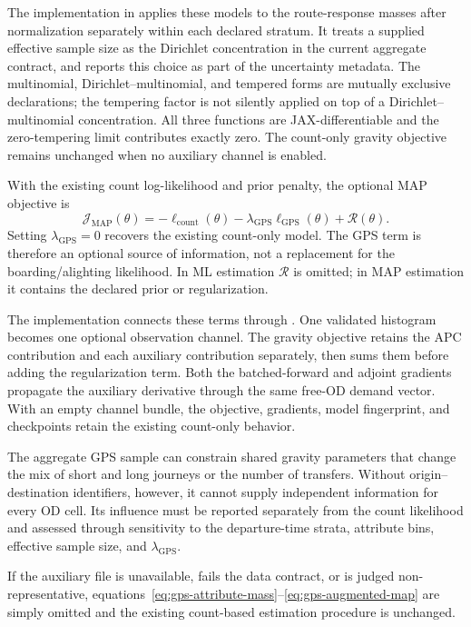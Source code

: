 The implementation in
 applies these
models to the route-response masses after normalization separately within
each declared stratum.  It treats a supplied effective sample size as the
Dirichlet concentration in the current aggregate contract, and reports this
choice as part of the uncertainty metadata.  The multinomial,
Dirichlet--multinomial, and tempered forms are mutually exclusive
declarations; the tempering factor is not silently applied on top of a
Dirichlet--multinomial concentration.  All three functions are
JAX-differentiable and the zero-tempering limit contributes exactly zero.  The
count-only gravity objective remains unchanged when no auxiliary channel is
enabled.

With the existing count log-likelihood and prior penalty, the optional MAP
objective is
\begin{equation}
  \mathcal{J}_{\mathrm{MAP}}(\theta)
  =-\ell_{\mathrm{count}}(\theta)
   -\lambda_{\mathrm{GPS}}\ell_{\mathrm{GPS}}(\theta)
   +\mathcal{R}(\theta).
  \label{eq:gps-augmented-map}
\end{equation}
Setting $\lambda_{\mathrm{GPS}}=0$ recovers the existing count-only model.
The GPS term is therefore an optional source of information, not a replacement
for the boarding/alighting likelihood.  In ML estimation $\mathcal{R}$ is
omitted; in MAP estimation it contains the declared prior or regularization.

The implementation connects these terms through
.  One
validated histogram becomes one optional observation channel.  The gravity
objective retains the APC contribution and each auxiliary contribution
separately, then sums them before adding the regularization term.  Both the
batched-forward and adjoint gradients propagate the auxiliary derivative
through the same free-OD demand vector.  With an empty channel bundle, the
objective, gradients, model fingerprint, and checkpoints retain the existing
count-only behavior.

The aggregate GPS sample can constrain shared gravity parameters that change
the mix of short and long journeys or the number of transfers.  Without
origin--destination identifiers, however, it cannot supply independent
information for every OD cell.  Its influence must be reported separately from
the count likelihood and assessed through sensitivity to the departure-time
strata, attribute bins, effective sample size, and
$\lambda_{\mathrm{GPS}}$.

If the auxiliary file is unavailable, fails the data contract, or is judged
non-representative, equations~\eqref{eq:gps-attribute-mass}--\eqref{eq:gps-augmented-map}
are simply omitted and the existing count-based estimation procedure is
unchanged.
